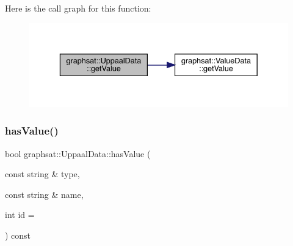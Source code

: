 Here is the call graph for this function\+:\nopagebreak
\begin{figure}[H]
\begin{center}
\leavevmode
\includegraphics[width=336pt]{classgraphsat_1_1_uppaal_data_a888305aeaea6a3df4c01950155a14c24_cgraph}
\end{center}
\end{figure}
\mbox{\label{classgraphsat_1_1_uppaal_data_ac64e8295d429d836f76bbec12eb7fa76}} 
\subsubsection{\texorpdfstring{hasValue()}{hasValue()}}
{\footnotesize\ttfamily bool graphsat\+::\+Uppaal\+Data\+::has\+Value (\begin{DoxyParamCaption}\item[{const string \&}]{type,  }\item[{const string \&}]{name,  }\item[{int}]{id = {} }\end{DoxyParamCaption}) const\hspace{0.3cm}{\ttfamily [inline]}}

